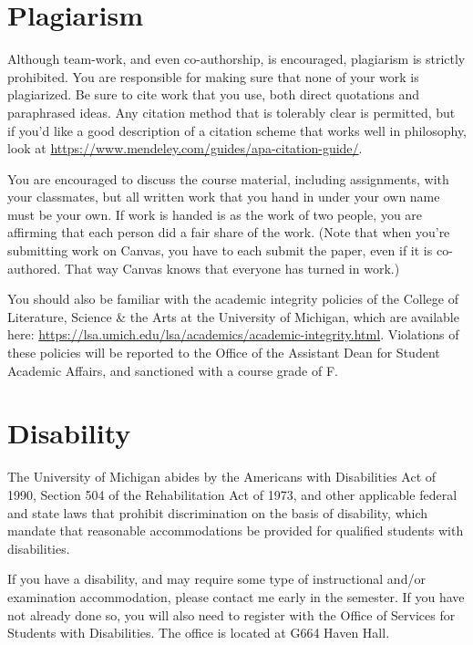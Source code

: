 \documentclass[
]{article}
\begin{document}
\newpage

\hypertarget{plagiarism}{%
\section{Plagiarism}\label{plagiarism}}

Although team-work, and even co-authorship, is encouraged, plagiarism is
strictly prohibited. You are responsible for making sure that none of
your work is plagiarized. Be sure to cite work that you use, both direct
quotations and paraphrased ideas. Any citation method that is tolerably
clear is permitted, but if you'd like a good description of a citation
scheme that works well in philosophy, look at
\url{https://www.mendeley.com/guides/apa-citation-guide/}.

You are encouraged to discuss the course material, including
assignments, with your classmates, but all written work that you hand in
under your own name must be your own. If work is handed is as the work
of two people, you are affirming that each person did a fair share of
the work. (Note that when you're submitting work on Canvas, you have to
each submit the paper, even if it is co-authored. That way Canvas knows
that everyone has turned in work.)

You should also be familiar with the academic integrity policies of the
College of Literature, Science \& the Arts at the University of
Michigan, which are available here:
\url{https://lsa.umich.edu/lsa/academics/academic-integrity.html}.
Violations of these policies will be reported to the Office of the
Assistant Dean for Student Academic Affairs, and sanctioned with a
course grade of F.

\hypertarget{disability}{%
\section{Disability}\label{disability}}

The University of Michigan abides by the Americans with Disabilities Act
of 1990, Section 504 of the Rehabilitation Act of 1973, and other
applicable federal and state laws that prohibit discrimination on the
basis of disability, which mandate that reasonable accommodations be
provided for qualified students with disabilities.

If you have a disability, and may require some type of instructional
and/or examination accommodation, please contact me early in the
semester. If you have not already done so, you will also need to
register with the Office of Services for Students with Disabilities. The
office is located at G664 Haven Hall.
\end{document}
